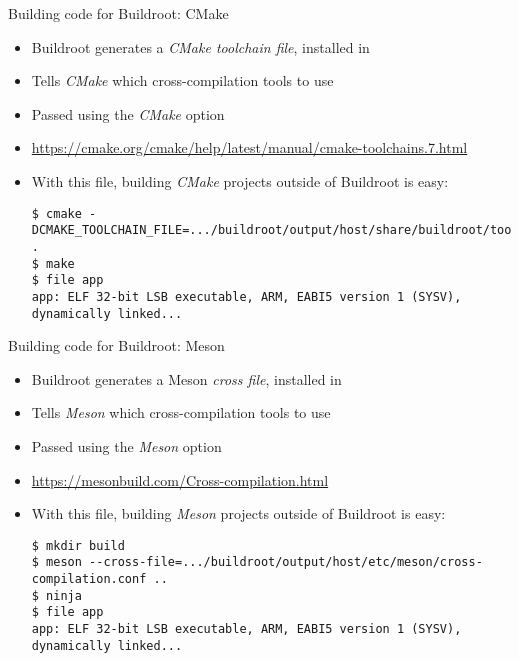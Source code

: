 \begin{frame}[fragile]{Building code for Buildroot: CMake}
  \begin{itemize}
  \item Buildroot generates a {\em CMake toolchain file}, installed in
  \item Tells {\em CMake} which cross-compilation tools to use
  \item Passed using the  {\em CMake} option
  \item \url{https://cmake.org/cmake/help/latest/manual/cmake-toolchains.7.html}
  \item With this file, building {\em CMake} projects outside of
    Buildroot is easy:
    \begin{block}{}
{\scriptsize
\begin{verbatim}
$ cmake -DCMAKE_TOOLCHAIN_FILE=.../buildroot/output/host/share/buildroot/toolchainfile.cmake .
$ make
$ file app
app: ELF 32-bit LSB executable, ARM, EABI5 version 1 (SYSV), dynamically linked...
\end{verbatim}}
\end{block}
\end{itemize}
\end{frame}

\begin{frame}[fragile]{Building code for Buildroot: Meson}
  \begin{itemize}
  \item Buildroot generates a Meson {\em cross file}, installed in
  \item Tells {\em Meson} which cross-compilation tools to use
  \item Passed using the  {\em Meson} option
  \item \url{https://mesonbuild.com/Cross-compilation.html}
  \item With this file, building {\em Meson} projects outside of
    Buildroot is easy:
    \begin{block}{}
{\scriptsize
\begin{verbatim}
$ mkdir build
$ meson --cross-file=.../buildroot/output/host/etc/meson/cross-compilation.conf ..
$ ninja
$ file app
app: ELF 32-bit LSB executable, ARM, EABI5 version 1 (SYSV), dynamically linked...
\end{verbatim}}
\end{block}
\end{itemize}
\end{frame}

